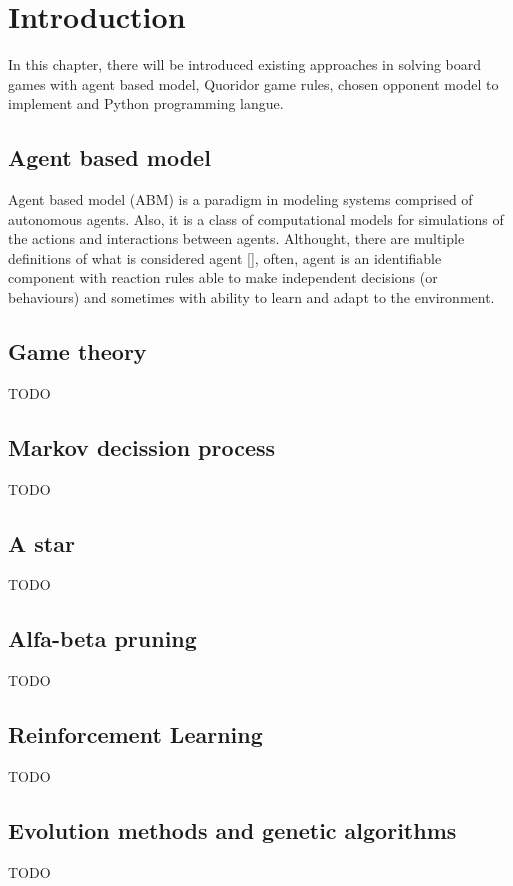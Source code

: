 \chapter{Introduction}\label{chap:1}
  In this chapter, there will be introduced existing approaches in solving
board games with agent based model, Quoridor game rules, chosen opponent model
to implement and Python programming langue.

\section{Agent based model}
Agent based model (ABM) is a paradigm in modeling systems comprised
of autonomous agents. Also, it is a class of computational models for
simulations of the actions and interactions between agents. Althought, there
are multiple definitions of what is considered agent [\cite{abm}], often, agent
is an identifiable component with reaction rules able to make independent
decisions (or behaviours) and sometimes with ability to learn and adapt to
the environment.

\section{Game theory}
TODO

\section{Markov decission process}
TODO

\section{A star}
TODO

\section{Alfa-beta pruning}
TODO

\section{Reinforcement Learning}
TODO

\section{Evolution methods and genetic algorithms}
TODO

